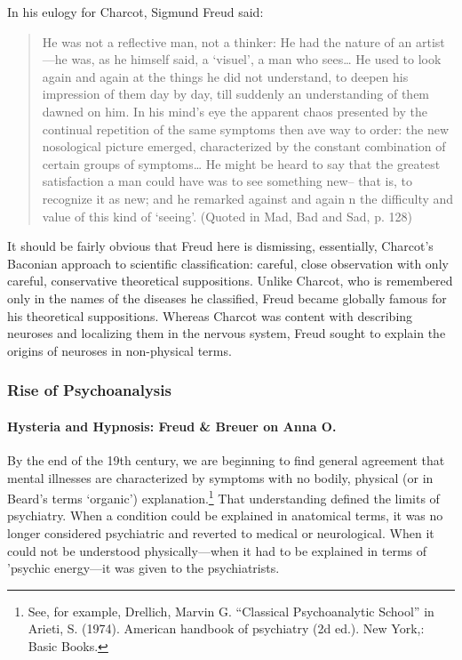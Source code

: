 In his eulogy for Charcot, Sigmund Freud said:

\begin{quote}

He was not a reflective man, not a thinker: He had the nature of an artist---he was, as he himself said, a `visuel', a man who sees{\ldots} He used to look again and again at the things he did not understand, to deepen his impression of them day by day, till suddenly an understanding of them dawned on him. In his mind's eye the apparent chaos presented by the continual repetition of the same symptoms then ave way to order: the new nosological picture emerged, characterized by the constant combination of certain groups of symptoms{\ldots} He might be heard to say that the greatest satisfaction a man could have was to see something new-- that is, to recognize it as new; and he remarked against and again n the difficulty and value of this kind of `seeing'. (Quoted in Mad, Bad and Sad, p. 128)
\end{quote}

It should be fairly obvious that Freud here is dismissing, essentially, Charcot's Baconian approach to scientific classification: careful, close observation with only careful, conservative theoretical suppositions. Unlike Charcot, who is remembered only in the names of the diseases he classified, Freud became globally famous for his theoretical suppositions. Whereas Charcot was content with describing neuroses and localizing them in the nervous system, Freud sought to explain the origins of neuroses in non-physical terms.

\subsubsection{Rise of Psychoanalysis}
\label{riseofpsychoanalysis}

\paragraph{Hysteria and Hypnosis: Freud \& Breuer on Anna O.}
\label{hysteriaandhypnosis:freudbreueronannao.}

By the end of the 19th century, we are beginning to find general agreement that mental illnesses are characterized by symptoms with no bodily, physical (or in Beard's terms `organic') explanation.\footnote{See, for example, Drellich, Marvin G. ``Classical Psychoanalytic School'' in Arieti, S. (1974). American handbook of psychiatry (2d ed.). New York,: Basic Books.} That understanding defined the limits of psychiatry. When a condition could be explained in anatomical terms, it was no longer considered psychiatric and reverted to medical or neurological. When it could not be understood physically---when it had to be explained in terms of 'psychic energy---it was given to the psychiatrists.

